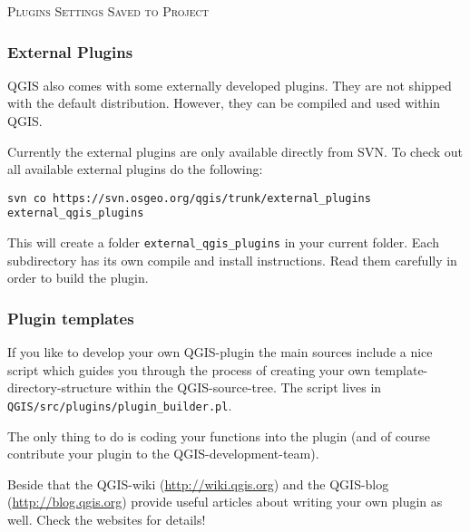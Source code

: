 \normalsize


\begin{Tip}\caption{\textsc{Plugins Settings Saved to Project}}
\end{Tip}

%
%
\subsubsection{External Plugins}\label{sec:external_plugins}

QGIS also comes with some externally developed plugins.
They are not shipped with the default distribution.
However, they can be compiled and used within QGIS.

Currently the external plugins are only available directly from SVN.
To check out all available external plugins do the following:
\begin{verbatim}
svn co https://svn.osgeo.org/qgis/trunk/external_plugins external_qgis_plugins
\end{verbatim}

This will create a folder \texttt{external\_qgis\_plugins} in your current folder.
Each subdirectory has its own compile and install instructions.
Read them carefully in order to build the plugin.

%
%
\subsubsection{Plugin templates}\label{sec:plugin_template}

If you like to develop your own QGIS-plugin the main sources include a nice script which guides you through the process of creating your own template-directory-structure within the QGIS-source-tree.
The script lives in \texttt{QGIS/src/plugins/plugin\_builder.pl}.

The only thing to do is coding your functions into the plugin (and of course contribute your plugin to the QGIS-development-team).

Beside that the QGIS-wiki (\url{http://wiki.qgis.org}) and the QGIS-blog (\url{http://blog.qgis.org}) provide useful articles about writing your own plugin as well.
Check the websites for details!
